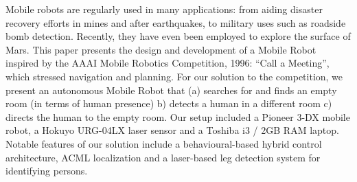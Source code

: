 \documentclass[]{report}
\begin{document}
	
	
	Mobile robots are regularly used in many applications: from aiding disaster recovery efforts in mines and after earthquakes, to military uses such as roadside bomb detection. Recently, they have even been employed to explore the surface of Mars. This paper presents the design and development of a Mobile Robot inspired by the AAAI Mobile Robotics Competition, 1996: “Call a Meeting”, which stressed navigation and planning.  For our solution to the competition, we present an autonomous Mobile Robot that (a) searches for and finds an empty room (in terms of human presence) b) detects a human in a different room c) directs the human to the empty room. Our setup included a Pioneer 3-DX mobile robot, a Hokuyo URG-04LX laser sensor and a Toshiba i3 / 2GB RAM laptop. Notable features of our solution include a behavioural-based hybrid control architecture, ACML localization and a laser-based leg detection system for identifying persons.

	
\end{document}
